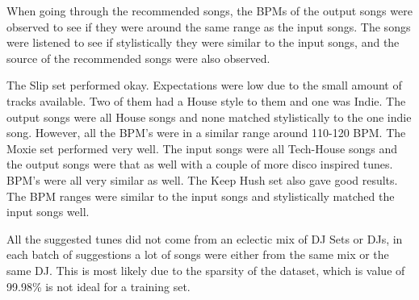 When going through the recommended songs, the BPMs of the output songs were observed to see if they were around the same range as the input songs. The songs were listened to see if stylistically they were similar to the input songs, and the source of the recommended songs were also observed.

The Slip set performed okay. Expectations were low due to the small amount of tracks available. Two of them had a House style to them and one was Indie. The output songs were all House songs and none matched stylistically to the one indie song. However, all the BPM's were in a similar range around 110-120 BPM. The Moxie set performed very well. The input songs were all Tech-House songs and the output songs were that as well with a couple of more disco inspired tunes. BPM's were all very similar as well. The Keep Hush set also gave good results. The BPM ranges were similar to the input songs and stylistically matched the input songs well. 

All the suggested tunes did not come from an eclectic mix of DJ Sets or DJs, in each batch of suggestions a lot of songs were either from the same mix or the same DJ. This is most likely due to the sparsity of the dataset, which is value of 99.98\% is not ideal for a training set. 

